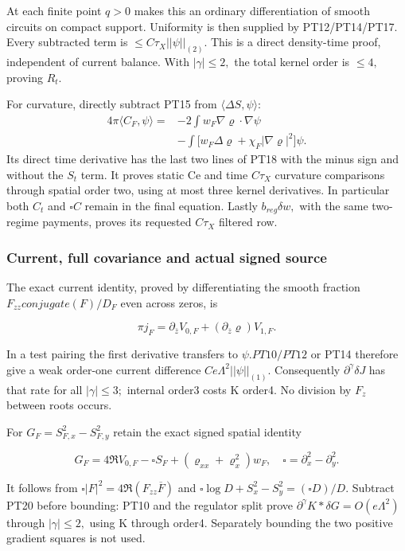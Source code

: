 At each finite point \(q>0\) makes this an ordinary differentiation of smooth circuits on compact support. Uniformity is then supplied by PT12/PT14/PT17. Every subtracted term is \(\le C \tau_{X}||\psi||_{(2)}.\) This is a direct density-time proof, independent of current balance. With \(|\gamma|\le 2,\) the total kernel order is \(\le 4,\) proving \(R_{t}.\)

For curvature, directly subtract PT15 from $\langle\Delta S,\psi\rangle$:
\[
\begin{split}
4\pi\langle C_F,\psi\rangle={}&-2\int w_F\nabla\varrho\cdot\nabla\psi\\
 &-\int\bigl[w_F\Delta\varrho+\chi_F|\nabla\varrho|^2\bigr]\psi.
\end{split}
\]
Its direct time derivative has the last two lines of PT18 with the minus sign and without the \(S_{t}\) term. It proves static Ce and time \(C \tau_{X}\) curvature comparisons through spatial order two, using at most three kernel derivatives. In particular both \(C_{t}\) and $\square C$ remain in the final equation. Lastly \(b_{reg} \delta w,\) with the same two-regime payments, proves its requested \(C \tau_{X}\) filtered row.

\subsubsection{Current, full covariance and actual signed source}
\label{subsec:pt-6}

The exact current identity, proved by differentiating the smooth fraction \(F_{zz} conjugate(F)/D_{F}\) even across zeros, is

\[
\pi j_F=\partial_{\bar z}V_{0,F}
                      +(\partial_{\bar z}\varrho)V_{1,F}.
\tag{PT19}\label{eq:ansatz-pt19}
\]

In a test pairing the first derivative transfers to \(\psi. PT10/PT12\) or PT14 therefore give a weak order-one current difference \(Ce \Lambda^{2}||\psi||_{(1)}.\) Consequently \(\partial^{\gamma} \delta J\) has that rate for all \(|\gamma|\le 3;\) internal order3 costs K order4. No division by \(F_{z}\) between roots occurs.

For \(G_{F}=S_{F,x}^{2}-S_{F,y}^{2}\) retain the exact signed spatial identity

\[
G_F=4\Re V_{0,F}-\square S_F
                        +(\varrho_{xx}+\varrho_x^2)w_F,
\quad \square=\partial_x^2-\partial_y^2.
\tag{PT20}\label{eq:ansatz-pt20}
\]

It follows from \(\square|F|^{2}=4\Re(F_{zz} \overline F)\) and \(\square \log D+S_{x}^{2}-S_{y}^{2}=(\square D)/D.\) Subtract PT20 before bounding: PT10 and the regulator split prove \(\partial^{\gamma} K*\delta G =O(e \Lambda^{2})\) through \(|\gamma|\le 2,\) using K through order4. Separately bounding the two positive gradient squares is not used.

